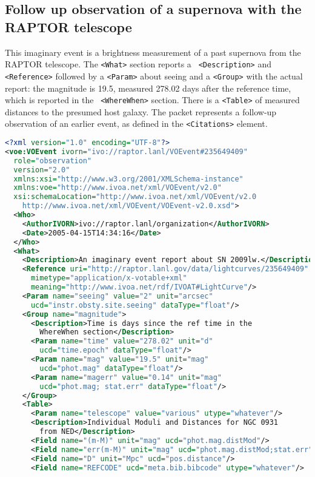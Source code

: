 \documentclass[11pt,a4paper]{ivoa}
\begin{document}
\subsection{Follow up observation of a supernova with the RAPTOR telescope}
This imaginary event is a brightness measurement of a past supernova from the 
RAPTOR \citep{bib10} telescope. The \texttt{<What>} section reports a \texttt{
<Description>} and \texttt{<Reference>} followed by a \texttt{<Param>} about seeing 
and a \texttt{<Group>} with the actual report: the magnitude is 19.5, measured 
278.02 days after the reference time, which is reported in the \texttt{
<WhereWhen>} section. There is a \texttt{<Table>} of measured distances to the 
presumed host galaxy. The packet represents a follow-up observation of an 
earlier event, as defined in the \texttt{<Citations>} element. 
\begin{lstlisting}[language=XML]
<?xml version="1.0" encoding="UTF-8"?>
<voe:VOEvent ivorn="ivo://raptor.lanl/VOEvent#235649409" 
  role="observation" 
  version="2.0"
  xmlns:xsi="http://www.w3.org/2001/XMLSchema-instance"
  xmlns:voe="http://www.ivoa.net/xml/VOEvent/v2.0"
  xsi:schemaLocation="http://www.ivoa.net/xml/VOEvent/v2.0
    http://www.ivoa.net/xml/VOEvent/VOEvent-v2.0.xsd">
  <Who>
    <AuthorIVORN>ivo://raptor.lanl/organization</AuthorIVORN>
    <Date>2005-04-15T14:34:16</Date>
  </Who>
  <What>
    <Description>An imaginary event report about SN 2009lw.</Description>
    <Reference uri="http://raptor.lanl.gov/data/lightcurves/235649409"
      mimetype="application/x-votable+xml"
      meaning="http://www.ivoa.net/rdf/IVOAT#LightCurve"/>
    <Param name="seeing" value="2" unit="arcsec"
      ucd="instr.obsty.site.seeing" dataType="float"/>
    <Group name="magnitude">
      <Description>Time is days since the ref time in the
        WhereWhen section</Description>
      <Param name="time" value="278.02" unit="d"
        ucd="time.epoch" dataType="float"/>
      <Param name="mag" value="19.5" unit="mag"
        ucd="phot.mag" dataType="float"/>
      <Param name="magerr" value="0.14" unit="mag"
        ucd="phot.mag; stat.err" dataType="float"/>
    </Group>
    <Table>
      <Param name="telescope" value="various" utype="whatever"/>
      <Description>Individual Moduli and Distances for NGC 0931
        from NED</Description>
      <Field name="(m-M)" unit="mag" ucd="phot.mag.distMod"/>
      <Field name="err(m-M)" unit="mag" ucd="phot.mag.distMod;stat.err"/>
      <Field name="D" unit="Mpc" ucd="pos.distance"/>
      <Field name="REFCODE" ucd="meta.bib.bibcode" utype="whatever"/>

\end{lstlisting}
\end{document}
